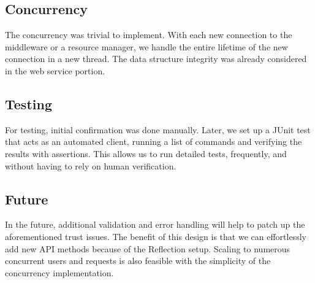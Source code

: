 \documentclass[11pt]{article}
\begin{document}
\subsection*{Concurrency}

The concurrency was trivial to implement. With each new connection to the middleware or a resource manager, we handle the entire lifetime of the new connection in a new thread. The data structure integrity was already considered in the web service portion. \par

\subsection*{Testing}

For testing, initial confirmation was done manually. Later, we set up a JUnit test that acts as an automated client, running a list of commands and verifying the results with assertions. This allows us to run detailed tests, frequently, and without having to rely on human verification. \par

\subsection*{Future}

In the future, additional validation and error handling will help to patch up the aforementioned trust issues. The benefit of this design is that we can effortlessly add new API methods because of the Reflection setup. Scaling to numerous concurrent users and requests is also feasible with the simplicity of the concurrency implementation. \par
\end{document}
